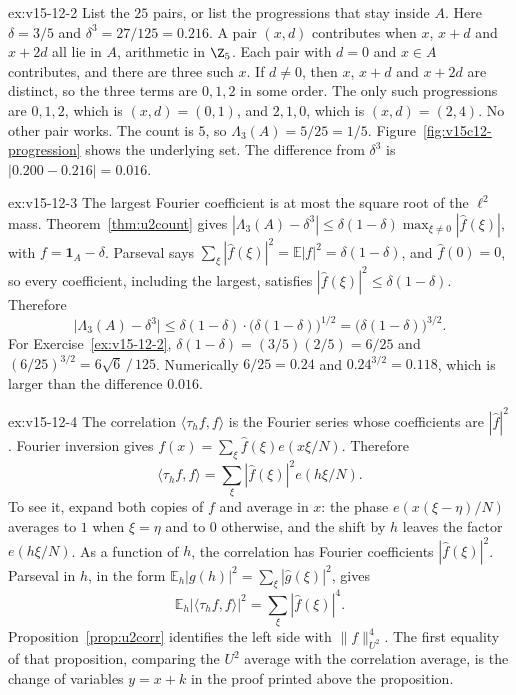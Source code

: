 \begin{solution}{ex:v15-12-2}
\idea List the \(25\) pairs, or list the progressions that stay inside \(A\).
\writeup Here \(\delta=3/5\) and \(\delta^3=27/125=0.216\). A pair \((x,d)\) contributes when \(x\), \(x+d\) and \(x+2d\) all lie in \(A\), arithmetic in \(\Z_5\). Each pair with \(d=0\) and \(x\in A\) contributes, and there are three such \(x\). If \(d\ne0\), then \(x\), \(x+d\) and \(x+2d\) are distinct, so the three terms are \(0,1,2\) in some order. The only such progressions are \(0,1,2\), which is \((x,d)=(0,1)\), and \(2,1,0\), which is \((x,d)=(2,4)\). No other pair works. The count is \(5\), so \(\Lambda_3(A)=5/25=1/5\). Figure~\ref{fig:v15c12-progression} shows the underlying set. The difference from \(\delta^3\) is \(|0.200-0.216|=0.016\).
\end{solution}

\begin{solution}{ex:v15-12-3}
\idea The largest Fourier coefficient is at most the square root of the \(\ell^2\) mass.
\writeup Theorem~\ref{thm:u2count} gives \(|\Lambda_3(A)-\delta^3|\le\delta(1-\delta)\max_{\xi\ne0}|\hat f(\xi)|\), with \(f=\mathbf 1_A-\delta\). Parseval says \(\sum_\xi|\hat f(\xi)|^2=\mathbb E|f|^2=\delta(1-\delta)\), and \(\hat f(0)=0\), so every coefficient, including the largest, satisfies \(|\hat f(\xi)|^2\le\delta(1-\delta)\). Therefore
\[
\bigl|\Lambda_3(A)-\delta^3\bigr|\le\delta(1-\delta)\cdot\bigl(\delta(1-\delta)\bigr)^{1/2}=\bigl(\delta(1-\delta)\bigr)^{3/2}.
\]
For Exercise~\ref{ex:v15-12-2}, \(\delta(1-\delta)=(3/5)(2/5)=6/25\) and \((6/25)^{3/2}=6\sqrt6\,/\,125\). Numerically \(6/25=0.24\) and \(0.24^{3/2}=0.118\), which is larger than the difference \(0.016\).
\end{solution}

\begin{solution}{ex:v15-12-4}
\idea The correlation \(\langle\tau_hf,f\rangle\) is the Fourier series whose coefficients are \(|\hat f|^2\).
\writeup Fourier inversion gives \(f(x)=\sum_\xi\hat f(\xi)e(x\xi/N)\). Therefore
\[
\langle\tau_hf,f\rangle
=\sum_\xi|\hat f(\xi)|^2e(h\xi/N).
\]
To see it, expand both copies of \(f\) and average in \(x\): the phase \(e(x(\xi-\eta)/N)\) averages to \(1\) when \(\xi=\eta\) and to \(0\) otherwise, and the shift by \(h\) leaves the factor \(e(h\xi/N)\). As a function of \(h\), the correlation has Fourier coefficients \(|\hat f(\xi)|^2\). Parseval in \(h\), in the form \(\mathbb E_h|g(h)|^2=\sum_\xi|\hat g(\xi)|^2\), gives
\[
\mathbb E_h\bigl|\langle\tau_hf,f\rangle\bigr|^2=\sum_\xi|\hat f(\xi)|^4.
\]
Proposition~\ref{prop:u2corr} identifies the left side with \(\|f\|_{U^2}^4\). The first equality of that proposition, comparing the \(U^2\) average with the correlation average, is the change of variables \(y=x+k\) in the proof printed above the proposition.
\end{solution}


